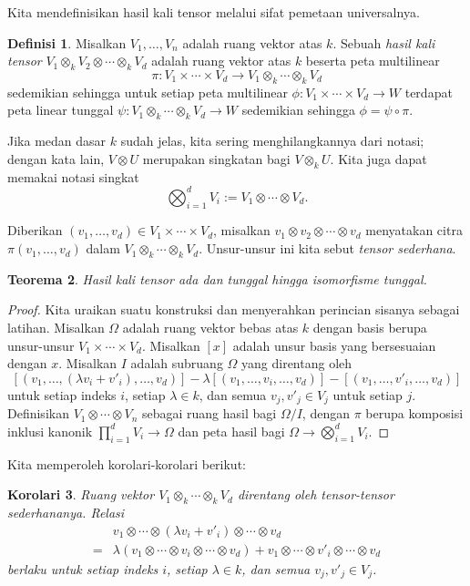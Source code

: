 \documentclass[12pt]{article}
\theoremstyle{plain}
\newtheorem{theorem}{Teorema}[section]
\newtheorem{corollary}[theorem]{Korolari}
\theoremstyle{definition}
\newtheorem{definition}[theorem]{Definisi}
\theoremstyle{remark}
\numberwithin{equation}{section}
\begin{document}
Kita mendefinisikan hasil kali tensor melalui sifat pemetaan universalnya.

\begin{definition}
Misalkan $V_1,\ldots, V_n$ adalah ruang vektor atas $k$.
Sebuah \emph{hasil kali tensor} $V_1 \otimes_k V_2 \otimes \cdots \otimes_k V_d$
adalah ruang vektor atas $k$ beserta peta multilinear
\[
\pi : V_1 \times \cdots \times V_d
\to  V_1 \otimes_k \cdots \otimes_k V_d
\]
sedemikian sehingga untuk setiap peta multilinear $\phi : V_1 \times \cdots \times V_d
\to W$ terdapat peta linear tunggal
$\psi : V_1 \otimes_k \cdots \otimes_k V_d \to W$ sedemikian sehingga
$\phi = \psi \circ \pi$.
\end{definition}

Jika medan dasar $k$ sudah jelas, kita sering menghilangkannya dari
notasi; dengan kata lain, $V \otimes U$ merupakan singkatan bagi $V \otimes_k U$.
Kita juga dapat memakai notasi singkat
\[
\bigotimes_{i=1}^d V_i := V_1 \otimes \cdots \otimes V_d .
\]

Diberikan $(v_1,\ldots, v_d) \in V_1 \times \cdots \times V_d$,
misalkan $v_1 \otimes v_2 \otimes \cdots \otimes v_d$ menyatakan citra
$\pi(v_1,\ldots,v_d)$ dalam $V_1 \otimes_k \cdots \otimes_k V_d$.
Unsur-unsur ini kita sebut \emph{tensor sederhana}.

\begin{theorem}
Hasil kali tensor ada dan tunggal hingga isomorfisme tunggal.
\end{theorem}

\begin{proof}
Kita uraikan suatu konstruksi dan menyerahkan perincian sisanya sebagai latihan.
Misalkan $\Omega$ adalah ruang vektor bebas atas $k$ dengan basis berupa unsur-unsur
$V_1 \times \cdots \times V_d$. Misalkan $[x]$ adalah unsur basis
yang bersesuaian dengan $x$.
Misalkan $I$ adalah subruang $\Omega$ yang direntang oleh
\[
[(v_1, \ldots, (\lambda v_i + v'_i), \ldots, v_d)]
-
\lambda[(v_1, \ldots,v_i, \ldots, v_d)] -
[(v_1, \ldots, v'_i, \ldots, v_d)]
\]
untuk setiap indeks $i$, setiap $\lambda \in k$, dan semua $v_j,v'_j \in V_j$
untuk setiap $j$.
Definisikan $V_1 \otimes \cdots \otimes V_n$ sebagai ruang hasil bagi
$\Omega/I$, dengan $\pi$ berupa komposisi inklusi kanonik
$\prod_{i=1}^d V_i \to \Omega$ dan peta hasil bagi $\Omega \to
\bigotimes_{i=1}^d V_i$.
\end{proof}

Kita memperoleh korolari-korolari berikut:

\begin{corollary}
Ruang vektor $V_1 \otimes_k \cdots \otimes_k V_d$
direntang oleh tensor-tensor sederhananya.
Relasi
\begin{align*}
&v_1 \otimes \cdots \otimes (\lambda v_i + v'_i) \otimes \cdots \otimes
v_d\\
=&
\lambda(v_1 \otimes \cdots \otimes v_i \otimes \cdots \otimes v_d) +
v_1 \otimes \cdots \otimes v'_i \otimes \cdots \otimes v_d
\end{align*}
berlaku
untuk setiap indeks $i$, setiap $\lambda \in k$, dan semua $v_j,v'_j \in V_j$.
\end{corollary}
\end{document}
